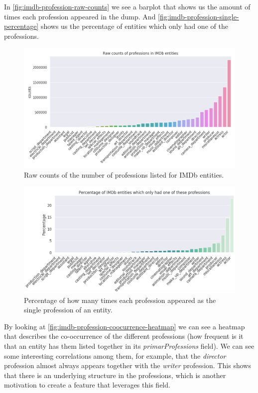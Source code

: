 \documentclass[epsfig,a4paper,11pt,titlepage,twoside,openany]{book}
\begin{document}
In \autoref{fig:imdb-profession-raw-counts} we see a barplot that shows us the amount of times each profession appeared in the dump. And \autoref{fig:imdb-profession-single-percentage} shows us the percentage of entities which only had one of the professions.

\begin{figure}[]
  \centering \includegraphics[width=\textwidth]{raw_profession_counts_imdb}
  \caption{Raw counts of the number of professions listed for IMDb entities.}
  \label{fig:imdb-profession-raw-counts}
\end{figure}


\begin{figure}[]
  \centering \includegraphics[width=\textwidth]{imdb_percentage_single_professions}
  \caption{Percentage of how many times each profession appeared as the single profession of an entity.}
  \label{fig:imdb-profession-single-percentage}
\end{figure}


By looking at \autoref{fig:imdb-profession-coocurrence-heatmap} we can see a heatmap that describes the co-occurrence of the different professions (how frequent is it that an entity has them listed together in its \textit{primarProfessions} field). We can see some interesting correlations among them, for example, that the \textit{director} profession almost always appears together with the \textit{writer} profession. This shows that there is an underlying structure in the professions, which is another motivation to create a feature that leverages this field.
\end{document}
